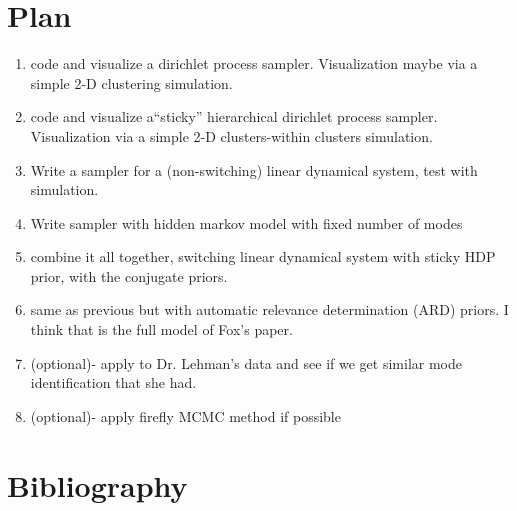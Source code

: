 \documentclass[12pt]{article}
\begin{document}
\section{Plan}
\begin{enumerate}
\item code and visualize a dirichlet process sampler. Visualization maybe via a simple 2-D clustering simulation.
\item code and visualize a``sticky'' hierarchical dirichlet process sampler. Visualization via a simple 2-D clusters-within clusters simulation.
\item Write a sampler for a (non-switching) linear dynamical system, test with simulation.
\item Write sampler with hidden markov model with fixed number of modes
\item combine it all together, switching linear dynamical system with sticky HDP prior, with the conjugate priors.
\item same as previous but with automatic relevance determination (ARD) priors. I think that is the full model of Fox's paper.
\item (optional)- apply to Dr. Lehman's data and see if we get similar mode identification that she had.
\item (optional)- apply firefly MCMC method if possible
\end{enumerate}

\section{Bibliography}
\end{document}
